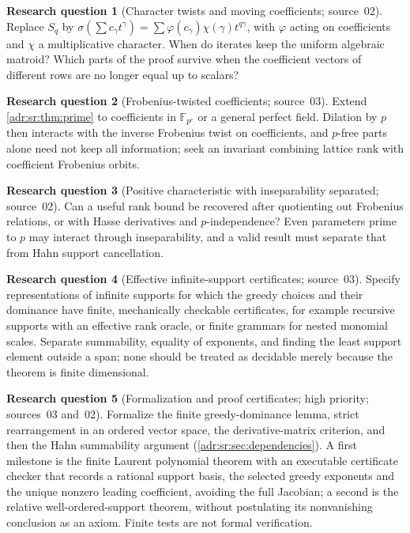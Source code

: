 \documentclass[11pt,letterpaper]{article}
\numberwithin{equation}{section}
\theoremstyle{definition}
\newtheorem{question}{Research question}
\theoremstyle{remark}
\begin{document}
\begin{question}[Character twists and moving coefficients; source~02]
Replace $S_q$ by
$\sigma(\sum c_\gamma t^\gamma)=\sum\varphi(c_\gamma)\chi(\gamma)t^{q\gamma}$,
with $\varphi$ acting on coefficients and $\chi$ a multiplicative character.
When do iterates keep the uniform algebraic matroid? Which parts of the proof
survive when the coefficient vectors of different rows are no longer equal up
to scalars?
\end{question}

\begin{question}[Frobenius-twisted coefficients; source~03]
Extend \cref{adr:sr:thm:prime} to coefficients in $\mathbb F_{p^e}$ or a
general perfect field. Dilation by $p$ then interacts with the inverse
Frobenius twist on coefficients, and $p$-free parts alone need not keep all
information; seek an invariant combining lattice rank with coefficient
Frobenius orbits.
\end{question}

\begin{question}[Positive characteristic with inseparability separated; source~02]
Can a useful rank bound be recovered after quotienting out Frobenius
relations, or with Hasse derivatives and $p$-independence? Even parameters
prime to $p$ may interact through inseparability, and a valid result must
separate that from Hahn support cancellation.
\end{question}

\begin{question}[Effective infinite-support certificates; source~03]
Specify representations of infinite supports for which the greedy choices and
their dominance have finite, mechanically checkable certificates, for example
recursive supports with an effective rank oracle, or finite grammars for nested
monomial scales. Separate summability, equality of exponents, and finding the
least support element outside a span; none should be treated as decidable
merely because the theorem is finite dimensional.
\end{question}

\begin{question}[Formalization and proof certificates; high priority; sources~03 and~02]
Formalize the finite greedy-dominance lemma, strict rearrangement in an
ordered vector space, the derivative-matrix criterion, and then the Hahn
summability argument (\cref{adr:sr:sec:dependencies}). A first milestone is the
finite Laurent polynomial theorem with an executable certificate checker that
records a rational support basis, the selected greedy exponents and the unique
nonzero leading coefficient, avoiding the full Jacobian; a second is the
relative well-ordered-support theorem, without postulating its nonvanishing
conclusion as an axiom. Finite tests are not formal verification.
\end{question}
\end{document}
